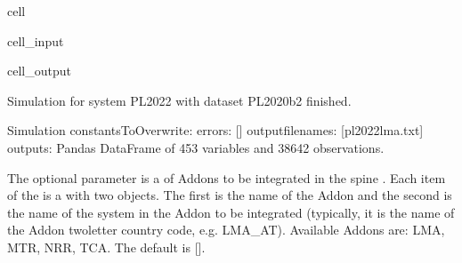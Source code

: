 \documentclass[letterpaper,10pt,english]{sphinxmanual}
\begin{document}
\begin{sphinxuseclass}{cell}
\begin{sphinxuseclass}{cell_input}
\begin{sphinxVerbatim}[commandchars=\\\{\}]
 \PYG{p}{[}\PYG{p}{]}\PYG{p}{[}\PYG{p}{]}\PYG{p}{[}\PYG{p}{]}
\end{sphinxVerbatim}

\end{sphinxuseclass}
\begin{sphinxuseclass}{cell_output}
\begin{sphinxVerbatim}[commandchars=\\\{\}]
Simulation for system PL\PYGZus{}2022 with dataset PL\PYGZus{}2020\PYGZus{}b2 finished.
\end{sphinxVerbatim}

\begin{sphinxVerbatim}[commandchars=\\\{\}]
\PYGZhy{}\PYGZhy{}\PYGZhy{}\PYGZhy{}\PYGZhy{}\PYGZhy{}\PYGZhy{}\PYGZhy{}\PYGZhy{}\PYGZhy{}\PYGZhy{}\PYGZhy{}\PYGZhy{}\PYGZhy{}\PYGZhy{}\PYGZhy{}\PYGZhy{}\PYGZhy{}\PYGZhy{}\PYGZhy{}\PYGZhy{}\PYGZhy{}\PYGZhy{}\PYGZhy{}\PYGZhy{}\PYGZhy{}\PYGZhy{}\PYGZhy{}\PYGZhy{}\PYGZhy{}
Simulation
\PYGZhy{}\PYGZhy{}\PYGZhy{}\PYGZhy{}\PYGZhy{}\PYGZhy{}\PYGZhy{}\PYGZhy{}\PYGZhy{}\PYGZhy{}\PYGZhy{}\PYGZhy{}\PYGZhy{}\PYGZhy{}\PYGZhy{}\PYGZhy{}\PYGZhy{}\PYGZhy{}\PYGZhy{}\PYGZhy{}\PYGZhy{}\PYGZhy{}\PYGZhy{}\PYGZhy{}\PYGZhy{}\PYGZhy{}\PYGZhy{}\PYGZhy{}\PYGZhy{}\PYGZhy{}
	 constantsToOverwrite: \PYGZob{}\PYGZcb{}
	 errors: []
	 output\PYGZus{}filenames: [\PYGZsq{}pl\PYGZus{}2022\PYGZus{}lma.txt\PYGZsq{}]
	 outputs: Pandas DataFrame of 453 variables and 38642 observations.
\end{sphinxVerbatim}

\end{sphinxuseclass}
\end{sphinxuseclass}
\sphinxAtStartPar
The optional parameter  is a  of   Addons to be integrated in the spine . Each item of the  is   a  with two  objects. The first   is the name of the Addon and the second  is the name of the system in the Addon to be integrated (typically, it is the name of the Addon \sphinxcode{\sphinxupquote{\_}} two\sphinxhyphen{}letter country code, e.g. LMA\_AT).  Available Addons are: LMA, MTR, NRR, TCA. The default is {[}{]}.
\end{document}
